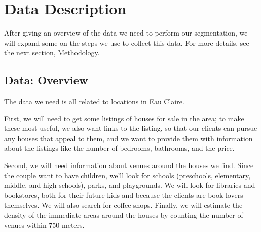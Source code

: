 \documentclass{article}
\begin{document}
\section{Data Description}
After giving an overview of the data we need to perform our segmentation, we will expand some on the steps we use to collect this data. For more details, see the next section, Methodology. 

\subsection{Data: Overview}
The data we need is all related to locations in Eau Claire. 

First, we will need to get some listings
of houses for sale in the area; to make these most useful, we also want links to the listing, so that
our clients can pursue any houses that appeal to them, and we want to provide them with information 
about the listings like the number of bedrooms, bathrooms, and the price. 

Second, we will need information about venues around the houses we find. Since the couple want 
to have children, we'll look for schools (preschools, elementary, middle, and high schools), 
parks, and playgrounds. We will look for libraries and bookstores, both for their future kids
and because the clients are book lovers themselves. We will also search for coffee shops. Finally,
we will estimate the density of the immediate areas around the houses by counting the number
of venues within 750 meters. 
\end{document}
